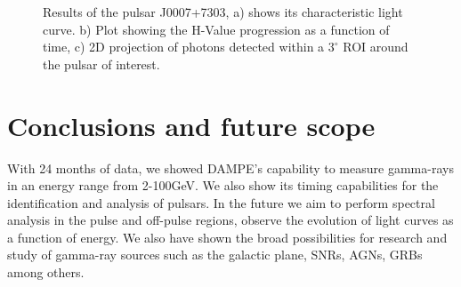 \documentclass{PoS}
\begin{document}
\begin{figure}
\centering
{}
{}
\caption{Results of the pulsar J0007+7303, a)  shows its characteristic  light curve. b) Plot showing the H-Value progression as a function of time, c) 2D projection of photons detected within a $ 3^{\circ}$ ROI around the pulsar of interest.}
\label{j0007}
\end{figure}




\section{Conclusions and future scope}
With 24 months of  data, we showed DAMPE's capability to measure gamma-rays in an energy range from 2-100GeV.
We also show its timing capabilities for the identification and analysis of pulsars.
In the future we aim to perform spectral analysis in the pulse and off-pulse regions, observe the evolution of light curves  as a function of energy.
We also have shown the broad possibilities for research and study of gamma-ray sources such as the galactic plane, SNRs, AGNs, GRBs among others.
\end{document}
